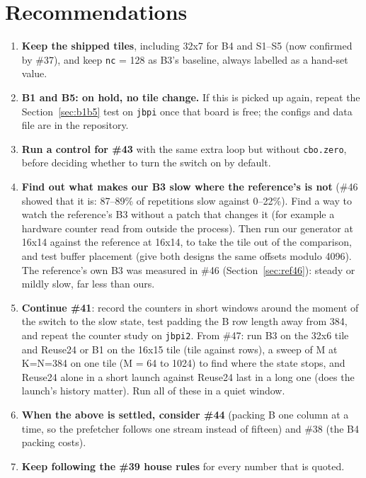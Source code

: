 \documentclass[11pt,a4paper]{article}
\begin{document}
\section{Recommendations}
\begin{enumerate}
  \item \textbf{Keep the shipped tiles}, including 32x7 for B4 and S1--S5 (now confirmed by \#37), and keep
  \texttt{nc} = 128 as B3's baseline, always labelled as a hand-set value.
  \item \textbf{B1 and B5: on hold, no tile change.} If this is picked up again, repeat the Section~\ref{sec:b1b5}
  test on \texttt{jbpi} once that board is free; the configs and data file are in the repository.
  \item \textbf{Run a control for \#43} with the same extra loop but without \texttt{cbo.zero}, before deciding
  whether to turn the switch on by default.
  \item \textbf{Find out what makes our B3 slow where the reference's is not} (\#46 showed that it is: 87--89\% of repetitions slow against 0--22\%). Find a way to watch the
  reference's B3 without a patch that changes it (for example a hardware counter read from outside the process). Then run our generator at 16x14 against the reference at 16x14, to take the tile out of
  the comparison, and test buffer placement (give both designs the same offsets modulo 4096). The reference's own B3 was
  measured in \#46 (Section~\ref{sec:ref46}): steady or mildly slow, far less than ours.
  \item \textbf{Continue \#41}: record the counters in short windows around the moment of the switch to the slow
  state, test padding the B row length away from 384, and repeat the counter study on \texttt{jbpi2}. From \#47: run B3 on the 32x6
  tile and Reuse24 or B1 on the 16x15 tile (tile against rows), a sweep of M at K=N=384 on one tile (M = 64 to 1024) to find where the
  state stops, and Reuse24 alone in a short launch against Reuse24 last in a long one (does the launch's history matter).
  Run all of these in a quiet window.
  \item \textbf{When the above is settled, consider \#44} (packing B one column at a time, so the prefetcher
  follows one stream instead of fifteen) and \#38 (the B4 packing costs).
  \item \textbf{Keep following the \#39 house rules} for every number that is quoted.
\end{enumerate}
\end{document}
